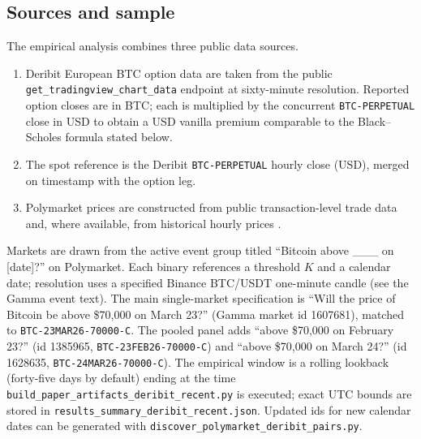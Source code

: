 \documentclass[11pt]{article}
\numberwithin{equation}{section}
\theoremstyle{plain}
\begin{document}
\subsection{Sources and sample}
The empirical analysis combines three public data sources.
\begin{enumerate}
    \item Deribit European BTC option data are taken from the public \texttt{get\_tradingview\_chart\_data} endpoint at sixty-minute resolution. Reported option closes are in BTC; each is multiplied by the concurrent \texttt{BTC-PERPETUAL} close in USD to obtain a USD vanilla premium comparable to the Black--Scholes formula stated below.
    \item The spot reference is the Deribit \texttt{BTC-PERPETUAL} hourly close (USD), merged on timestamp with the option leg.
    \item Polymarket prices are constructed from public transaction-level trade data and, where available, from historical hourly prices \citep{polymarketdocs}.
\end{enumerate}

Markets are drawn from the active event group titled ``Bitcoin above \_\_\_ on [date]?'' on Polymarket. Each binary references a threshold $K$ and a calendar date; resolution uses a specified Binance BTC/USDT one-minute candle (see the Gamma event text). The main single-market specification is ``Will the price of Bitcoin be above \$70{,}000 on March 23?'' (Gamma market id 1607681), matched to \texttt{BTC-23MAR26-70000-C}. The pooled panel adds ``above \$70{,}000 on February 23?'' (id 1385965, \texttt{BTC-23FEB26-70000-C}) and ``above \$70{,}000 on March 24?'' (id 1628635, \texttt{BTC-24MAR26-70000-C}). The empirical window is a rolling lookback (forty-five days by default) ending at the time \texttt{build\_paper\_artifacts\_deribit\_recent.py} is executed; exact UTC bounds are stored in \texttt{results\_summary\_deribit\_recent.json}. Updated ids for new calendar dates can be generated with \texttt{discover\_polymarket\_deribit\_pairs.py}.
\end{document}
